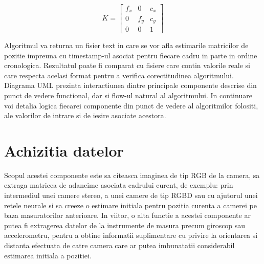 \documentclass[12pt,a4paper]{report}
\begin{document}
\begin{equation}
    K = 
    \begin{bmatrix}
        f_x & 0   & c_x \\
        0   & f_y & c_y \\
        0   & 0   & 1
    \end{bmatrix}
\end{equation}

Algoritmul va returna un fisier text in care se vor afla estimarile matricilor 
de pozitie impreuna cu timestamp-ul asociat pentru fiecare cadru in parte in ordine
cronologica. Rezultatul poate fi comparat cu fisiere care contin valorile reale si 
care respecta acelasi format pentru a verifica corectitudinea algoritmului.   
Diagrama UML prezinta interactiunea dintre 
principale componente descrise din punct de vedere functional, dar si flow-ul natural
al algoritmului. In continuare voi detalia logica fiecarei componente din punct de 
vedere al algoritmilor folositi, ale valorilor de intrare si de iesire asociate acestora. 

\section{Achizitia datelor}
Scopul acestei componente este sa citeasca imaginea de tip RGB de la camera,          
sa extraga matricea de adancime asociata cadrului curent, de exemplu: prin            
intermediul unei camere stereo, a unei camere de tip RGBD sau cu ajutorul unei retele 
neurale si sa creeze o estimare initiala pentru pozitia curenta a camerei pe baza     
masuratorilor anterioare. In viitor, o alta functie a acestei componente ar putea fi  
extragerea datelor de la instrumente de masura precum giroscop sau accelerometru,     
pentru a obtine informatii suplimentare cu privire la orientarea si distanta efectuata
de catre camera care ar putea imbunatatii considerabil estimarea initiala a pozitiei.
\end{document}
